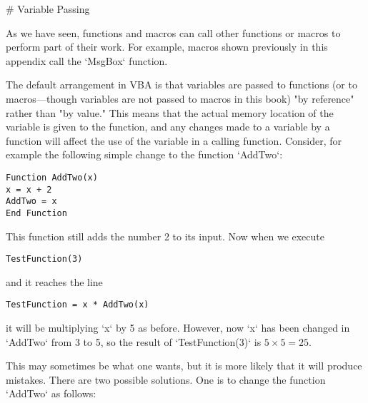 # Variable Passing


As we have seen, functions and macros can call other functions or macros
to perform part of their work. For example, macros shown previously in
this appendix call the `MsgBox` function.

The default arrangement in VBA is that variables are passed to functions
(or to macros---though variables are not passed to macros in this book)
"by reference" rather than "by value." This means that the actual memory
location of the variable is given to the function, and any changes made
to a variable by a function will affect the use of the variable in a
calling function. Consider, for example the following simple change to
the function `AddTwo`:

\small\begin{verbatim}
Function AddTwo(x)
x = x + 2
AddTwo = x
End Function
\end{verbatim}\normalsize
This function still adds the number 2 to its input.  Now when we execute 
\small\begin{verbatim}
TestFunction(3)
\end{verbatim}\normalsize and it reaches the line
\small\begin{verbatim}
TestFunction = x * AddTwo(x)
\end{verbatim}\normalsize
it will be multiplying `x` by 5 as before. However, now `x` has been
changed in `AddTwo` from 3 to 5, so the result of `TestFunction(3)` is
$5 \times 5 = 25$.

This may sometimes be what one wants, but it is more likely that it will
produce mistakes. There are two possible solutions. One is to change the
function `AddTwo` as follows:

